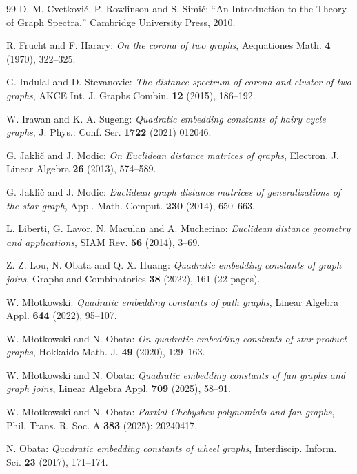 \documentclass[12pt,a4paper]{article}
\newcommand{\1}{{\bm 1}}
\numberwithin{equation}{section}
\begin{document}
\begin{thebibliography}{99}
D. M. Cvetkovi\'c, P. Rowlinson and S. Simi\'c:
``An Introduction to the Theory of Graph Spectra,''
Cambridge University Press, 2010.

R. Frucht and F. Harary:
\textit{On the corona of two graphs},
Aequationes Math. {\bfseries 4} (1970), 322--325.

G. Indulal and D. Stevanovic:
\textit{The distance spectrum of corona and cluster of two graphs},
AKCE Int. J. Graphs Combin. {\bfseries 12} (2015), 186--192.

W. Irawan and K. A. Sugeng:
\textit{Quadratic embedding constants of hairy cycle graphs},
J. Phys.: Conf. Ser. {\bfseries 1722} (2021) 012046.

G. Jakli\v{c} and J. Modic:
\textit{On Euclidean distance matrices of graphs},
Electron. J. Linear Algebra {\bfseries 26} (2013), 574--589.

G. Jakli\v{c} and J. Modic:
\textit{Euclidean graph distance matrices of generalizations
of the star graph},
Appl. Math. Comput. {\bfseries 230} (2014), 650--663.

L. Liberti, G. Lavor, N. Maculan and A. Mucherino:
\textit{Euclidean distance geometry and applications},
SIAM Rev. {\bfseries 56} (2014), 3--69.

Z. Z. Lou, N. Obata and Q. X. Huang:
\textit{Quadratic embedding constants of graph joins},
Graphs and Combinatorics {\bfseries 38} (2022), 161 (22 pages).

W. M\l otkowski:
\textit{Quadratic embedding constants of path graphs},
Linear Algebra Appl. {\bfseries 644} (2022), 95--107.

W. M\l otkowski and N. Obata:
\textit{On quadratic embedding constants of star product graphs},
Hokkaido Math. J. {\bfseries 49} (2020), 129--163.

W. M\l otkowski and N. Obata:
\textit{Quadratic embedding constants of fan graphs and graph joins},
Linear Algebra Appl. {\bfseries 709} (2025), 58--91.

W. M\l otkowski and N. Obata:
\textit{Partial Chebyshev polynomials and fan graphs},
Phil. Trans. R. Soc. A {\bfseries 383} (2025): 20240417. 

N. Obata:
\textit{Quadratic embedding constants of wheel graphs},
Interdiscip. Inform. Sci. {\bfseries 23} (2017), 171--174.


\end{thebibliography}
\end{document}
